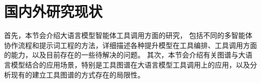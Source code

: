 % 
% 
% 

\section{国内外研究现状}



首先，本节会介绍大语言模型智能体工具调用方面的研究，
包括不同的多智能体协作流程和提示词工程的方法，详细描述各种提升模型在工具编排、工具调用方面的能力，以及目前存在的一些待解决的问题。
其次，本节会介绍有关图谱与大语言模型结合的应用场景，特别是工具图谱在大语言模型工具调用上的应用，以及分析现有的建立工具图谱的方式存在的局限性。

